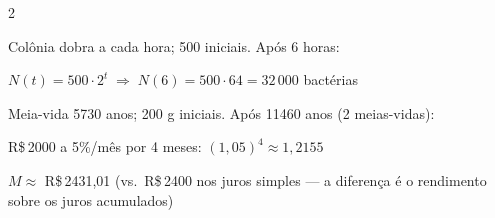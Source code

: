\documentclass[12pt]{article}
\begin{document}
\begin{multicols}{2}

Colônia dobra a cada hora; 500 iniciais. Após 6 horas:

$N(t) = 500 \cdot 2^t \;\Rightarrow\; N(6) = 500 \cdot 64 = \boxed{32\,000}$ bactérias


Meia-vida 5730 anos; 200 g iniciais. Após 11460 anos (2 meias-vidas):




R\$\,2000 a 5\%/mês por 4 meses: $(1{,}05)^4 \approx 1{,}2155$

$M \approx$ R\$\,2431,01 (vs.\ R\$\,2400 nos juros simples — a diferença é o rendimento
sobre os juros acumulados)

\end{multicols}


\end{document}
